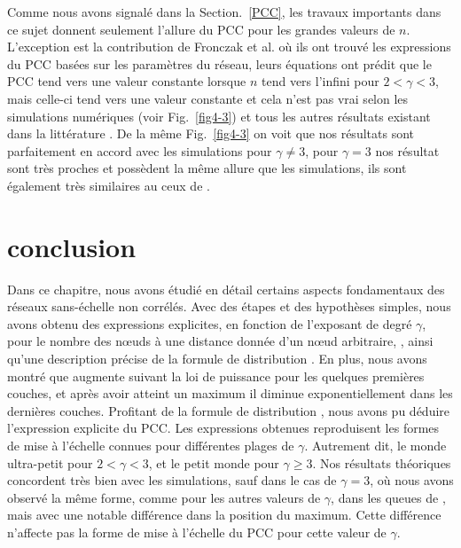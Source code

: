Comme nous avons signalé dans la Section.~\ref{PCC}, les travaux importants \cite{Do-al2003,Cohen-Havlin2003} dans ce sujet donnent seulement l'allure du PCC pour les grandes valeurs de $n$. L'exception est la contribution de Fronczak et  al. \cite{Fronczak-al2004} où ils ont trouvé les expressions du PCC basées sur les paramètres du réseau, leurs équations ont prédit que le PCC tend vers une valeur constante lorsque $n$ tend vers l'infini pour $2<\gamma<3$, mais celle-ci tend vers une valeur constante et cela n’est pas vrai selon les simulations numériques (voir Fig.~\ref{fig4-3}) et tous les autres résultats existant dans la littérature \cite{Do-al2003,Cohen-al2002,Chung-Lu2002,Fox-Bellwood2014,Hofstad-al2014,Cohen-Havlin2003}. De la même Fig.~\ref{fig4-3} on voit que nos résultats sont parfaitement en accord avec les simulations pour $\gamma\neq3$, pour $\gamma=3$ nos résultat sont très proches et possèdent la même allure que les simulations, ils sont également très similaires au ceux de \cite{Fronczak-al2004}.
 
\section{conclusion} 
Dans ce chapitre, nous avons étudié en détail certains aspects fondamentaux des réseaux sans-échelle non corrélés. Avec des étapes et des hypothèses simples, nous avons obtenu des expressions explicites, en fonction de l'exposant de degré $\gamma$, pour le nombre des nœuds à une distance donnée d'un nœud arbitraire, \nl\nolinebreak, ainsi qu'une description précise de la formule de distribution \nolinebreak. En plus, nous avons montré que \nl augmente suivant la loi de puissance pour les quelques premières couches, et après avoir atteint un maximum il diminue exponentiellement dans les dernières couches.
Profitant de la formule de distribution \nl, nous avons pu déduire l'expression explicite du PCC. Les expressions obtenues reproduisent les formes de mise à l'échelle connues pour différentes plages de $\gamma$. Autrement dit, le monde ultra-petit pour $2<\gamma<3$, et le petit monde pour $\gamma\ge 3$. Nos résultats théoriques concordent très bien avec les simulations, sauf dans le cas de $\gamma=3$, où nous avons observé la même forme, comme pour les autres valeurs de $\gamma$, dans les queues de \nl, mais avec une notable différence dans la position du maximum. Cette différence n'affecte pas la forme de mise à l'échelle du PCC pour cette valeur de $\gamma$.